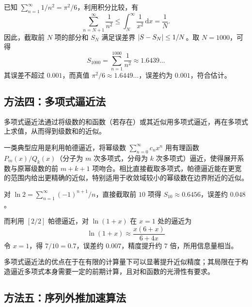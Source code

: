 \begin{example}
已知 $\displaystyle \sum_{n=1}^{\infty} 1/n^2 = \pi^2/6$，利用积分比较，有
\begin{equation}
\sum_{n=N+1}^{\infty} \frac{1}{n^2} \leq \int_N^{\infty} \frac{1}{x^2}\, \mathrm{d}x = \frac{1}{N}.
\end{equation}
因此，截取前 $N$ 项的部分和 $S_N$ 满足误差界 $\left|S - S_N\right| \leq 1/N$。取 $N = 1000$，可得
\begin{equation}
S_{1000} = \sum_{n=1}^{1000} \frac{1}{n^2} \approx 1.6439\ldots
\end{equation}
其误差不超过 $0.001$，而真值 $\pi^2/6 \approx 1.6449\ldots$，误差约为 $0.001$，符合估计。
\end{example}

\subsection{方法四：多项式逼近法}

多项式逼近法通过将级数的和函数（若存在）或其近似用多项式逼近，再在多项式上求值，从而得到级数和的近似。

一类典型应用是利用帕德逼近，将幂级数 $\displaystyle \sum_{n=0}^{\infty} c_n x^n$ 用有理函数 $P_m(x)/Q_k(x)$（分子为 $m$ 次多项式，分母为 $k$ 次多项式）逼近，使得展开系数与原幂级数的前 $m+k+1$ 项吻合。相比直接截取多项式，帕德逼近能在更宽的范围内给出更精确的近似，特别适用于收敛域较小的幂级数在边界附近的近似。

\begin{example}[帕德逼近与直接截断的比较]
对 $\displaystyle \ln 2 = \sum_{n=1}^{\infty} (-1)^{n+1}/n$，直接截取前 $10$ 项得 $S_{10} \approx 0.6456$，误差约 $0.048$。

而利用 $[2/2]$ 帕德逼近，对 $\ln(1+x)$ 在 $x=1$ 处的逼近为
\begin{equation}
\ln(1+x) \approx \frac{x(6+x)}{6+4x}
\end{equation}
令 $x = 1$，得 $7/10 = 0.7$，误差约 $0.007$，精度提升约 $7$ 倍，所用信息量相当。
\end{example}

多项式逼近法的优点在于在有限的计算量下可以显著提升近似精度；其局限在于构造逼近多项式本身需要一定的前期计算，且对和函数的光滑性有要求。

\subsection{方法五：序列外推加速算法}

